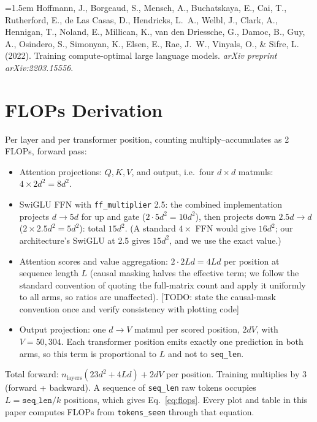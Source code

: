 \documentclass[11pt]{article}
\newcommand{\todo}[1]{\textcolor{warnred}{[TODO: #1]}}
\newcommand{\Ltr}{L}            %
\begin{document}
\noindent\hangindent=1.5em
Hoffmann, J., Borgeaud, S., Mensch, A., Buchatskaya, E., Cai, T.,
Rutherford, E., de Las Casas, D., Hendricks, L.~A., Welbl, J., Clark, A.,
Hennigan, T., Noland, E., Millican, K., van den Driessche, G., Damoc, B.,
Guy, A., Osindero, S., Simonyan, K., Elsen, E., Rae, J.~W., Vinyals, O., \&
Sifre, L. (2022). Training compute-optimal large language models.
\emph{arXiv preprint arXiv:2203.15556}.

\appendix

\section{FLOPs Derivation}
\label{app:flops}

Per layer and per transformer position, counting multiply--accumulates as 2
FLOPs, forward pass:
\begin{itemize}
  \item Attention projections: $Q, K, V$, and output, i.e.\ four $d \times
        d$ matmuls: $4 \times 2d^2 = 8d^2$.
  \item SwiGLU FFN with \texttt{ff\_multiplier} 2.5: the combined
        implementation projects $d \to 5d$ for up and gate ($2 \cdot 5d^2 =
        10d^2$), then projects down $2.5d \to d$ ($2 \times 2.5 d^2 =
        5d^2$): total $15d^2$. (A standard $4\times$ FFN would give
        $16d^2$; our architecture's SwiGLU at 2.5 gives $15d^2$, and we use
        the exact value.)
  \item Attention scores and value aggregation: $2 \cdot 2 \Ltr d = 4\Ltr d$
        per position at sequence length $\Ltr$ (causal masking halves the
        effective term; we follow the standard convention of quoting the
        full-matrix count and apply it uniformly to all arms, so ratios are
        unaffected). \todo{state the causal-mask convention once and verify
        consistency with plotting code}
  \item Output projection: one $d \to V$ matmul per scored position,
        $2dV$, with $V = 50{,}304$. Each transformer position emits exactly
        one prediction in both arms, so this term is proportional to
        $\Ltr$ and not to \texttt{seq\_len}.
\end{itemize}
Total forward: $n_{\mathrm{layers}}(23d^2 + 4\Ltr d) + 2dV$ per position.
Training multiplies by 3 (forward + backward). A sequence of
\texttt{seq\_len} raw tokens occupies $\Ltr = \texttt{seq\_len}/k$ positions,
which gives Eq.~\eqref{eq:flops}. Every plot and table in this paper computes
FLOPs from \texttt{tokens\_seen} through that equation.
\end{document}
